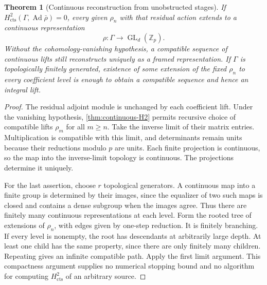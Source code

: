 \documentclass[11pt]{article}
\newtheorem{theorem}{Theorem}[section]
\theoremstyle{definition}
\theoremstyle{remark}
\begin{document}
\begin{theorem}[Continuous reconstruction from unobstructed stages]\label{thm:continuous-tower}
If $H^2_{\mathrm{cts}}(\Gamma,\operatorname{Ad}\bar\rho)=0$, every given $\rho_n$ with that residual action extends to a continuous representation
\[
 \rho:\Gamma\longrightarrow\operatorname{GL}_d(\mathbb Z_p).
\]
Without the cohomology-vanishing hypothesis, a compatible sequence of continuous lifts still reconstructs uniquely as a framed representation. If $\Gamma$ is topologically finitely generated, existence of \emph{some} extension of the fixed $\rho_n$ to every coefficient level is enough to obtain a compatible sequence and hence an integral lift.
\end{theorem}
\begin{proof}
The residual adjoint module is unchanged by each coefficient lift. Under the vanishing hypothesis, \cref{thm:continuous-H2} permits recursive choice of compatible lifts $\rho_m$ for all $m\geq n$. Take the inverse limit of their matrix entries. Multiplication is compatible with this limit, and determinants remain units because their reductions modulo $p$ are units. Each finite projection is continuous, so the map into the inverse-limit topology is continuous. The projections determine it uniquely.

For the last assertion, choose $r$ topological generators. A continuous map into a finite group is determined by their images, since the equalizer of two such maps is closed and contains a dense subgroup when the images agree. Thus there are finitely many continuous representations at each level. Form the rooted tree of extensions of $\rho_n$, with edges given by one-step reduction. It is finitely branching. If every level is nonempty, the root has descendants at arbitrarily large depth. At least one child has the same property, since there are only finitely many children. Repeating gives an infinite compatible path. Apply the first limit argument. This compactness argument supplies no numerical stopping bound and no algorithm for computing $H^2_{\mathrm{cts}}$ of an arbitrary source.
\end{proof}
\end{document}
